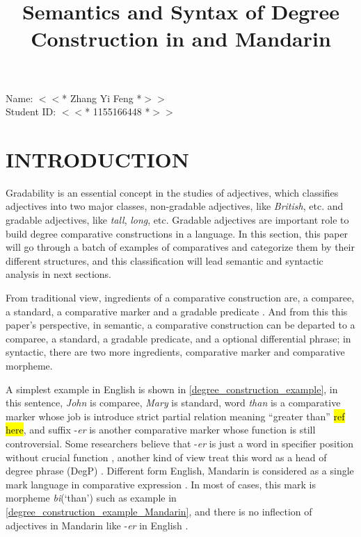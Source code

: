 \documentclass{ctexart}
\title{Semantics and Syntax of Degree Construction in and Mandarin}
\date{\vspace{-10ex}}
\let \cite \parencite
\begin{document}
\thispagestyle{empty} %

\begin{center}

Name: $<<$* Zhang Yi Feng *$>>$ \\
Student ID: $<<$* 1155166448 *$>>$

\end{center}

{\let\newpage\relax\maketitle}


\section{INTRODUCTION}

\setcounter{page}{1}

\noindent
Gradability is an essential concept in the studies of adjectives, which classifies adjectives into two major classes, non-gradable adjectives, like \textit{British}, etc. and gradable adjectives, like \textit{tall}, \textit{long}, etc. Gradable adjectives are important role to build degree comparative constructions in a language. In this section, this paper will go through a batch of examples of comparatives and categorize them by their different structures, and this classification will lead semantic and syntactic analysis in next sections. 

From traditional view, ingredients of a comparative construction are, a comparee, a standard, a comparative marker and a gradable predicate \cite{guo2012}. And from this this paper's perspective, in semantic, a comparative construction can be departed to a comparee, a standard, a gradable predicate, and a optional differential phrase; in syntactic, there are two more ingredients, comparative marker and comparative morpheme.

A simplest example in English is shown in \ref{degree_construction_example}, in this sentence, \textit{John} is comparee, \textit{Mary} is standard, word \textit{than} is a comparative marker whose job is introduce strict partial relation meaning ``greater than'' \hl{ref here}, and suffix -\textit{er} is another comparative marker whose function is still controversial. Some researchers believe that -\textit{er} is just a word in specifier position without crucial function \cite{von1984a,heim1985,bhatt2004,rullmann1995}, another kind of view treat this word as a head of degree phrase (DegP) \cite{bierwisch1989,corver1990,corver1993,corver1997a,kennedy1997,grano2012}. Different form English, Mandarin is considered as a single mark language in comparative expression \cite{bobaljik2012,grano2012}. In most of cases, this mark is morpheme \textit{bi}(`than') such as example in \ref{degree_construction_example_Mandarin}, and there is no inflection of adjectives in Mandarin like -\textit{er} in English \cite{guo2012}. 
\end{document}
